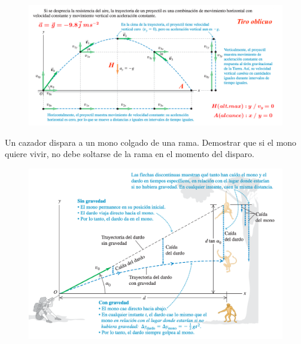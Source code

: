 \vspace{-5mm} \begin{figure}[H]
		\centering
		\includegraphics[width=1.1\textwidth]{imagenes/imagenes02/T02IM20.png}
		\end{figure}
		
\begin{prob} Un cazador dispara a un mono colgado de una rama. Demostrar que si el mono quiere vivir, no debe soltarse de la rama en el momento del disparo.
\end{prob}	
\begin{figure}[H]
		\centering
		\includegraphics[width=1\textwidth]{imagenes/imagenes02/T02IM21.png}
		\end{figure}		





